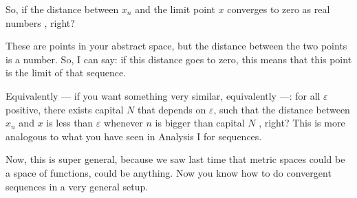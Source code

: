 \begin{speech}[00:04:33 - 00:06:22]
So, if the distance between $x_n$ and the limit point $x$ converges to zero as real numbers , right?

These are points in your abstract space, but the distance between the two points is a number. So, I can say: if this distance goes to zero, this means that this point is the limit of that sequence.

Equivalently --- if you want something very similar, equivalently  ---: for all $\varepsilon$ positive, there exists capital $N$ that depends on $\varepsilon$, such that the distance between $x_n$ and $x$ is less than $\varepsilon$ whenever $n$ is bigger than capital $N$ , right? This is more analogous to what you have seen in Analysis I for sequences.

Now, this is super general, because we saw last time that metric spaces could be a space of functions, could be anything. Now you know how to do convergent sequences in a very general setup.
\end{speech}

